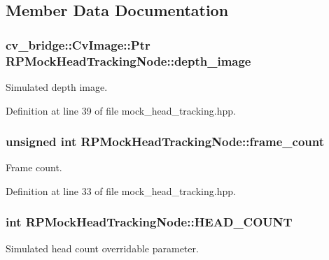 \subsection{\-Member \-Data \-Documentation}
\hypertarget{class_r_p_mock_head_tracking_node_a94d8f99ef984c889f722bc6da057df5f}{
\subsubsection[{depth\-\_\-image}]{\setlength{\rightskip}{0pt plus 5cm}cv\-\_\-bridge\-::\-Cv\-Image\-::\-Ptr {\bf \-R\-P\-Mock\-Head\-Tracking\-Node\-::depth\-\_\-image}}}\label{class_r_p_mock_head_tracking_node_a94d8f99ef984c889f722bc6da057df5f}
\-Simulated depth image. 

\-Definition at line 39 of file mock\-\_\-head\-\_\-tracking.\-hpp.

\hypertarget{class_r_p_mock_head_tracking_node_a00ba80d3ca138d7d586242a5655136f6}{
\subsubsection[{frame\-\_\-count}]{\setlength{\rightskip}{0pt plus 5cm}unsigned int {\bf \-R\-P\-Mock\-Head\-Tracking\-Node\-::frame\-\_\-count}}}\label{class_r_p_mock_head_tracking_node_a00ba80d3ca138d7d586242a5655136f6}
\-Frame count. 

\-Definition at line 33 of file mock\-\_\-head\-\_\-tracking.\-hpp.

\hypertarget{class_r_p_mock_head_tracking_node_a7397e364d5dec3ad0068e26dbb50e173}{
\subsubsection[{\-H\-E\-A\-D\-\_\-\-C\-O\-U\-N\-T}]{\setlength{\rightskip}{0pt plus 5cm}int {\bf \-R\-P\-Mock\-Head\-Tracking\-Node\-::\-H\-E\-A\-D\-\_\-\-C\-O\-U\-N\-T}}}\label{class_r_p_mock_head_tracking_node_a7397e364d5dec3ad0068e26dbb50e173}
\-Simulated head count overridable parameter. 

